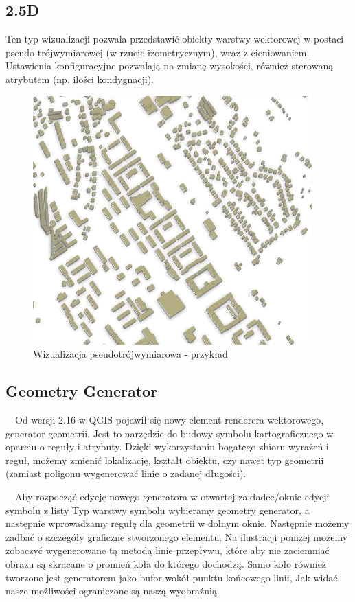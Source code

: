 \documentclass[12pt,a4paper]{book}
\begin{document}
\subsection{2.5D}
Ten typ wizualizacji pozwala przedstawić obiekty warstwy wektorowej w postaci pseudo trójwymiarowej (w rzucie izometrycznym), wraz z cieniowaniem. Ustawienia konfiguracyjne pozwalają na zmianę wysokości, również sterowaną atrybutem (np. ilości kondygnacji).

\begin{center}
\begin{figure}
\includegraphics[width=10.746cm,height=9.581cm]{007-25d.png}
\caption{Wizualizacja pseudotrójwymiarowa - przykład}
\end{figure}
\end{center}

\subsection{Geometry Generator}
\ \ Od wersji 2.16 w QGIS pojawił się nowy element renderera wektorowego, generator geometrii. Jest to narzędzie do budowy symbolu kartograficznego w oparciu o reguły i atrybuty. Dzięki wykorzystaniu bogatego zbioru wyrażeń i reguł, możemy zmienić lokalizację, kształt obiektu, czy nawet typ geometrii (zamiast poligonu wygenerować linie o zadanej długości).

\ \ Aby rozpocząć edycję nowego generatora w otwartej zakładce/oknie edycji symbolu z listy Typ warstwy symbolu wybieramy geometry generator,  a następnie wprowadzamy regułę dla geometrii w dolnym oknie. Następnie możemy zadbać o szczegóły graficzne stworzonego elementu. Na ilustracji poniżej możemy zobaczyć wygenerowane tą metodą linie przepływu, które aby nie zaciemniać obrazu są skracane o promień koła do którego dochodzą. Samo koło również tworzone jest generatorem jako bufor wokół punktu końcowego linii, Jak widać nasze możliwości ograniczone są naszą wyobraźnią.
\end{document}
